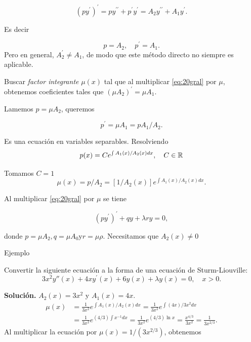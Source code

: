 $$\left(p y^{\prime}\right)^{\prime}=p y^{\prime \prime}+p^{\prime} y^{\prime}=A_{2} y^{\prime \prime}+A_{1}y^{\prime}.$$

Es decir 

$$p=A_{2},\quad p^{\prime}=A_{1}.$$
Pero en general, $A_{2}^{\prime} \neq A_{1}$, de modo que este método directo no siempre es aplicable.


 



 
 Buscar
 \emph{factor integrante} $\mu(x)$ tal que al multiplicar \eqref{eq:20gral} por $\mu$,  obtenemos coeficientes tales que  $\left(\mu A_{2}\right)^{\prime}=\mu A_{1}$. 
 
 
 Lamemos $p=\mu A_{2}$,  queremos 
 
 $$p^{\prime}=\mu A_{1}=p A_{1} / A_{2}.$$
 
 Es una ecuación en variables separables. Resolviendo
$$
p(x)=C e^{\int A_{1}(x) / A_{2}( x) d x},\quad C\in\mathbb{R}
$$

Tomamos $C=1$ 
$$\mu(x)=p / A_{2}=\left[1 / A_{2}(x)\right] e^{\int A_{1}(x) / A_{2}(x) d x}.$$

Al multiplicar \eqref{eq:20gral} por  $\mu$ se tiene

$$\left(p y^{\prime}\right)^{\prime}+q y+\lambda r y=0,$$

donde $p=\mu A_{2}, q=\mu A_{0} \mathrm{y} r=\mu \rho$. Necesitamos  que $A_{2}(x)\neq 0$



 



 

{Ejemplo}
 
 Convertir la siguiente ecuación a la forma de una ecuación de Sturm-Liouville:
$$
 3 x^{2} y''(x)+4 x y^{\prime}(x)+6 y(x)+\lambda y(x)=0, \quad x>0.
$$


\textbf{Solución.}  $A_{2}(x)=3 x^{2}$ y $A_{1}(x)=4 x$.
$$
\begin{aligned}
\mu(x) &=\frac{1}{3 x^{2}} e^{\int A_1(x) / A_2(x) d x}=\frac{1}{3 x^{2}} e^{\int(4 x)/3 x^{2} d x} \\
&=\frac{1}{3 x^{2}} e^{(4 / 3) \int x^{-1} d x}=\frac{1}{3 x^{2}} e^{(4 / 3) \ln x}=\frac{x^{4 / 3}}{3 x^{2}}=\frac{1}{3 x^{2 / 3}} .
\end{aligned}
$$
Al multiplicar la ecuación por $\mu(x)=1 /\left(3 x^{2 / 3}\right)$, obtenemos

